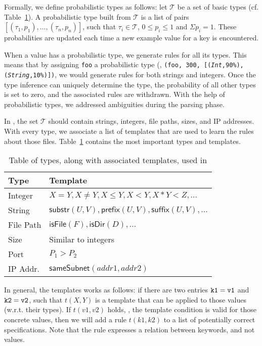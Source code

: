 Formally, we define probabilistic types as follows: let $\mathcal{T}$ be a set of basic types (cf. Table~\ref{table:kysymys}).
A probabilistic type built from $\mathcal{T}$ is a list of pairs 
$[(\tau_1, p_1),\ldots,(\tau_n, p_n)]$,
such that $\tau_i \in \mathcal{T}$, $0 \le p_i \le 1$ 
and $\Sigma p_i = 1$. 
These probabilities are updated each time a new example value 
for a key is encountered.

When a value has a probabilistic type, we generate rules for all its types.
This means that by assigning {\texttt{foo}} a probabilistic type 
(\eg, {\tt (\texttt{foo}, 300, [(\textsl{Int},90\%), 
(\textsl{String},10\%)])},
we would generate rules for both strings and integers.
Once the type inference can uniquely determine the type, 
the probability of all other types is set to zero, 
and the associated rules are withdrawn. With the help of probabilistic types, we addressed ambiguities during the parsing phase. 

In \app, the set $\mathcal{T}$ should contain strings, integers, file paths, 
sizes, and IP addresses. With every type, we associate a list of templates 
that are used to learn the rules about those files. Table~\ref{table:kysymys} contains
the most important types and templates.

\begin{table}
\caption{Table of types, along with associated templates, used in \app}
  \begin{tabular}{| l |  l |}
    \hline
    Type &  Template \\ \hline
    \hline
    Integer & $X = Y, X\neq Y, X \leq Y, X < Y, X * Y < Z, \ldots $\\ \hline
    String & $\textsf{substr}(U, V), \textsf{prefix}(U,V), \textsf{suffix}(U,V), \ldots$   \\ \hline
    File Path & $\textsf{isFile}(F), \textsf{isDir}(D),\ldots$   \\ \hline
    Size & Similar to integers   \\ \hline
    Port & $P_1 > P_2$ \\ \hline
    IP Addr.  & $\textsf{sameSubnet}(addr1, addr2)$   \\
    
    \hline
  \end{tabular}
\label{table:kysymys}
\end{table}

In general, the templates works as follows: if there are two entries ${\tt {k1 = v1}}$ and 
${\tt {k2 = v2}}$, such that $t(X, Y)$ is a template that can be applied to those values (w.r.t. their types).
If $t(v1, v2)$ holds, \ie, the template condition is valid for those concrete values, then we will add a rule
$t(k1, k2)$ to a list of potentially correct specifications. Note that the rule expresses a relation between keywords, and not values.

